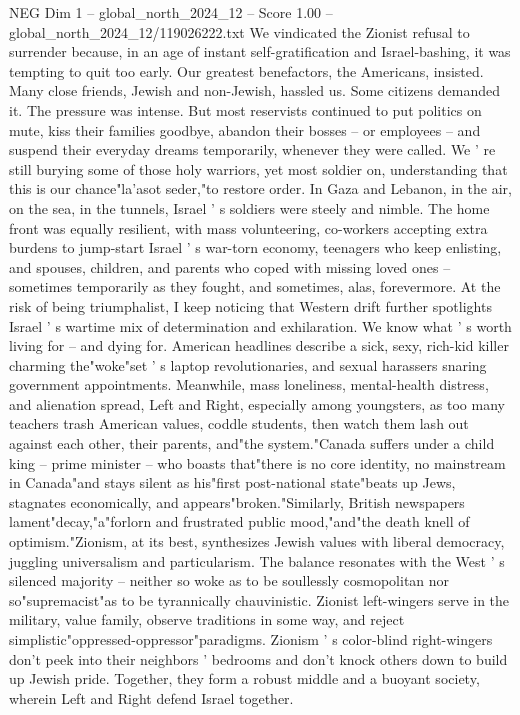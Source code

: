 \begin{textsample}{NEG Dim 1 – global\_north\_2024\_12 – Score 1.00 – global\_north\_2024\_12/119026222.txt}
We vindicated the Zionist refusal to surrender because, in an age of instant self-gratification and Israel-bashing, it was tempting to quit too early.
Our greatest benefactors, the Americans, insisted.
Many close friends, Jewish and non-Jewish, hassled us.
Some citizens demanded it.
The pressure was intense.
But most reservists continued to put politics on mute, kiss their families goodbye, abandon their bosses -- or employees -- and suspend their everyday dreams temporarily, whenever they were called.
We ' re still burying some of those holy warriors, yet most soldier on, understanding that this is our chance"la'asot seder,"to restore order.
In Gaza and Lebanon, in the air, on the sea, in the tunnels, Israel ' s soldiers were steely and nimble.
The home front was equally resilient, with mass volunteering, co-workers accepting extra burdens to jump-start Israel ' s war-torn economy, teenagers who keep enlisting, and spouses, children, and parents who coped with missing loved ones -- sometimes temporarily as they fought, and sometimes, alas, forevermore.
At the risk of being triumphalist, I keep noticing that Western drift further spotlights Israel ' s wartime mix of determination and exhilaration.
We know what ' s worth living for -- and dying for.
American headlines describe a sick, sexy, rich-kid killer charming the"woke"set ' s laptop revolutionaries, and sexual harassers snaring government appointments.
Meanwhile, mass loneliness, mental-health distress, and alienation spread, Left and Right, especially among youngsters, as too many teachers trash American values, coddle students, then watch them lash out against each other, their parents, and"the system."Canada suffers under a child king -- prime minister -- who boasts that"there is no core identity, no mainstream in Canada"and stays silent as his"first post-national state"beats up Jews, stagnates economically, and appears"broken."Similarly, British newspapers lament"decay,"a"forlorn and frustrated public mood,"and"the death knell of optimism."Zionism, at its best, synthesizes Jewish values with liberal democracy, juggling universalism and particularism.
The balance resonates with the West ' s silenced majority -- neither so woke as to be soullessly cosmopolitan nor so"supremacist"as to be tyrannically chauvinistic.
Zionist left-wingers serve in the military, value family, observe traditions in some way, and reject simplistic"oppressed-oppressor"paradigms.
Zionism ' s color-blind right-wingers don't peek into their neighbors ' bedrooms and don't knock others down to build up Jewish pride.
Together, they form a robust middle and a buoyant society, wherein Left and Right defend Israel together.

\end{textsample}
